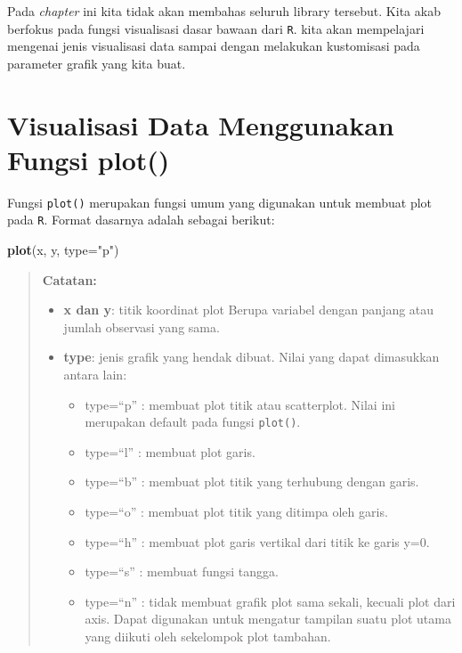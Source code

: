 \documentclass[
]{book}
\newenvironment{Shaded}{\begin{snugshade}}{\end{snugshade}}
\newcommand{\AttributeTok}[1]{\textcolor[rgb]{0.13,0.29,0.53}{#1}}
\newcommand{\FunctionTok}[1]{\textcolor[rgb]{0.13,0.29,0.53}{\textbf{#1}}}
\newcommand{\NormalTok}[1]{#1}
\newcommand{\StringTok}[1]{\textcolor[rgb]{0.31,0.60,0.02}{#1}}
\providecommand{\tightlist}{%
  \setlength{\itemsep}{0pt}\setlength{\parskip}{0pt}}
\theoremstyle{definition}
\theoremstyle{definition}
\theoremstyle{definition}
\theoremstyle{definition}
\theoremstyle{remark}
\begin{document}
Pada \emph{chapter} ini kita tidak akan membahas seluruh library tersebut. Kita akab berfokus pada fungsi visualisasi dasar bawaan dari \texttt{R}. kita akan mempelajari mengenai jenis visualisasi data sampai dengan melakukan kustomisasi pada parameter grafik yang kita buat.

\hypertarget{plotfunc}{%
\section{Visualisasi Data Menggunakan Fungsi plot()}\label{plotfunc}}

Fungsi \texttt{plot()} merupakan fungsi umum yang digunakan untuk membuat plot pada \texttt{R}. Format dasarnya adalah sebagai berikut:

\begin{Shaded}
\begin{Highlighting}[]
\FunctionTok{plot}\NormalTok{(x, y, }\AttributeTok{type=}\StringTok{"p"}\NormalTok{)}
\end{Highlighting}
\end{Shaded}

\begin{quote}
\textbf{Catatan:}

\begin{itemize}
\tightlist
\item
  \textbf{x dan y}: titik koordinat plot Berupa variabel dengan panjang atau jumlah observasi yang sama.
\item
  \textbf{type}: jenis grafik yang hendak dibuat. Nilai yang dapat dimasukkan antara lain:

  \begin{itemize}
  \tightlist
  \item
    type=``p'' : membuat plot titik atau scatterplot. Nilai ini merupakan default pada fungsi \texttt{plot()}.
  \item
    type=``l'' : membuat plot garis.
  \item
    type=``b'' : membuat plot titik yang terhubung dengan garis.
  \item
    type=``o'' : membuat plot titik yang ditimpa oleh garis.
  \item
    type=``h'' : membuat plot garis vertikal dari titik ke garis y=0.
  \item
    type=``s'' : membuat fungsi tangga.
  \item
    type=``n'' : tidak membuat grafik plot sama sekali, kecuali plot dari axis. Dapat digunakan untuk mengatur tampilan suatu plot utama yang diikuti oleh sekelompok plot tambahan.
  \end{itemize}
\end{itemize}
\end{quote}
\end{document}
